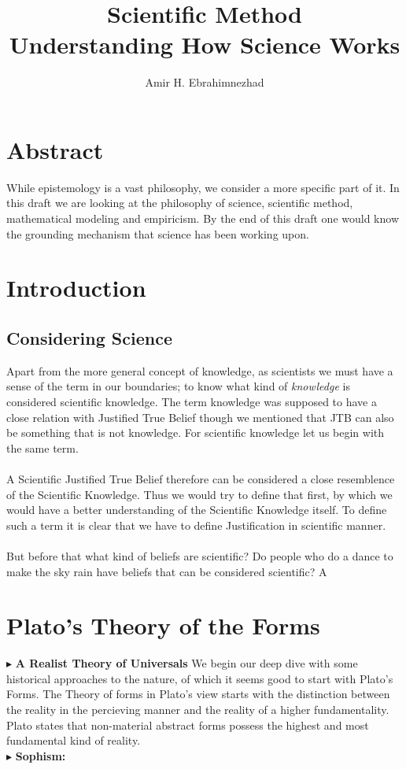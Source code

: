 \documentclass[9pt,a4paper,twocolumn]{article}
\title{Scientific Method \\ \large Understanding How Science Works}
\author{Amir H. Ebrahimnezhad}
\date{}
\newcounter{def}
\newcommand{\newpoint}[1]{\indent$\blacktriangleright$ \textbf{#1}}
\begin{document}
        \maketitle
        \tableofcontents
        \section*{Abstract}
            While epistemology is a vast philosophy, we consider a more specific part of it. In this draft we are looking at the philosophy of science, scientific method, mathematical modeling and empiricism. By the end of this draft one would know the grounding mechanism that science has been working upon.
        \section{Introduction}
            \subsection{Considering Science}
                Apart from the more general concept of knowledge, as scientists we must have a sense of the term in our boundaries; to know what kind of \textit{knowledge} is considered scientific knowledge. The term knowledge was supposed to have a close relation with Justified True Belief though we mentioned that JTB can also be something that is not knowledge. For scientific knowledge let us begin with the same term.
                \\
                \\
                A Scientific Justified True Belief therefore can be considered a close resemblence of the Scientific Knowledge. Thus we would try to define that first, by which we would have a better understanding of the Scientific Knowledge itself. To define such a term it is clear that we have to define Justification in scientific manner.
                \\
                \\
                But before that what kind of beliefs are scientific? Do people who do a dance to make the sky rain have beliefs that can be considered scientific? A 
        \section{Plato's Theory of the Forms}
            \newpoint{A Realist Theory of Universals}
            We begin our deep dive with some historical approaches to the nature, of which it seems good to start with Plato's Forms. The Theory of forms in Plato's view starts with the distinction between the reality in the percieving manner and the reality of a higher fundamentality. Plato states that non-material abstract forms possess the highest and most fundamental kind of reality. 
            \\
            \newpoint{Sophism: } 
\end{document}
